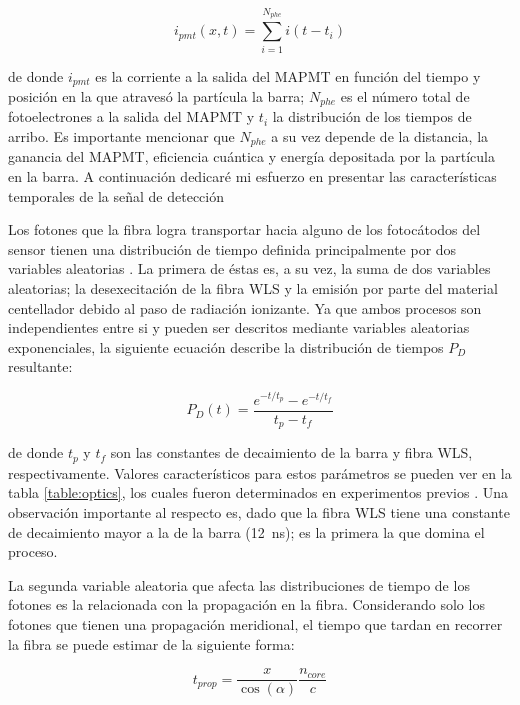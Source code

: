 \begin{equation}
\label{equ:current-pulse}
i_{pmt}\left(x,t\right)=\sum_{i=1}^{N_{phe}}i\left(t-t_{i}\right)
\end{equation}

de donde $i_{pmt}$ es la corriente a la salida del MAPMT en función del tiempo y posición en la que atravesó la partícula la barra; $N_{phe}$ es el número total de fotoelectrones a la salida del MAPMT y $t_{i}$ la distribución de los tiempos de arribo. Es importante mencionar que $N_{phe}$ a su vez depende de la distancia, la ganancia del MAPMT, eficiencia cuántica y energía depositada por la partícula en la barra. A continuación dedicaré mi esfuerzo en presentar las características temporales de la señal de detección

Los fotones que la fibra logra transportar hacia alguno de los fotocátodos del sensor tienen una distribución de tiempo definida principalmente por dos variables aleatorias \cite{sanchez10}. La primera de éstas es, a su vez, la suma de dos variables aleatorias; la desexecitación de la fibra WLS y la emisión por parte del material centellador debido al paso de radiación ionizante. Ya que ambos procesos son independientes entre si y pueden ser descritos mediante variables aleatorias exponenciales, la siguiente ecuación describe la distribución de tiempos $P_{D}$ resultante:

\begin{equation}
\label{equ:exponential-decay}
P_{D}(t)=\frac{e^{-t/t_{p}}-e^{-t/t_{f}}}{t_{p}-t_{f}}
\end{equation}

de donde $t_{p}$ y $t_{f}$ son las constantes de decaimiento de la barra y fibra WLS, respectivamente. Valores característicos para estos parámetros se pueden ver en la tabla \ref{table:optics}, los cuales fueron  determinados en experimentos previos \cite{gros18,mineev11}. Una observación importante al respecto es, dado que la fibra WLS tiene una constante de decaimiento mayor a la de la barra (\SI{12}{\nano\second}); es la primera la que domina el proceso.

La segunda variable aleatoria que afecta las distribuciones de tiempo de los fotones es la relacionada con la propagación en la fibra. Considerando solo los fotones que tienen una propagación meridional, el tiempo que tardan en recorrer la fibra se puede estimar de la siguiente forma:

\begin{equation}
\label{equ:meridional}
t_{prop}=\frac{x}{\cos(\alpha)}\frac{n_{core}}{c}
\end{equation}

